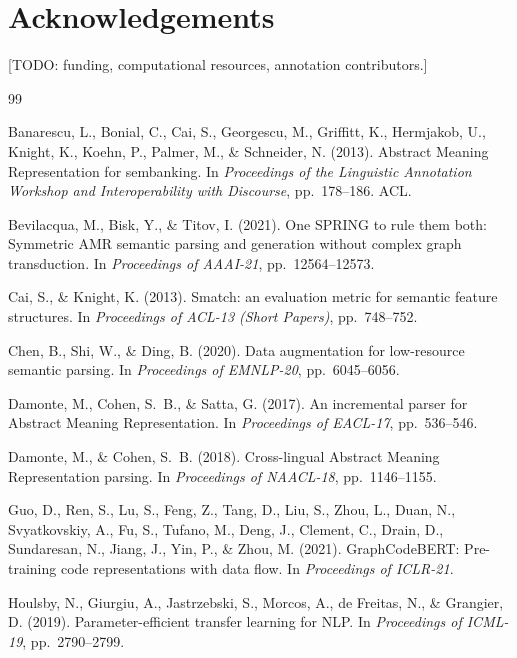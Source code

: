 \documentclass[11pt,a4paper]{article}
\begin{document}
\section*{Acknowledgements}

[TODO: funding, computational resources, annotation contributors.]


\begin{thebibliography}{99}

Banarescu, L., Bonial, C., Cai, S., Georgescu, M., Griffitt, K., Hermjakob,
U., Knight, K., Koehn, P., Palmer, M., \& Schneider, N. (2013).
Abstract Meaning Representation for sembanking.
In \textit{Proceedings of the Linguistic Annotation Workshop and Interoperability with Discourse},
pp.\ 178--186. ACL.

Bevilacqua, M., Bisk, Y., \& Titov, I. (2021).
One SPRING to rule them both: Symmetric AMR semantic parsing and generation
without complex graph transduction.
In \textit{Proceedings of AAAI-21}, pp.\ 12564--12573.

Cai, S., \& Knight, K. (2013).
Smatch: an evaluation metric for semantic feature structures.
In \textit{Proceedings of ACL-13 (Short Papers)}, pp.\ 748--752.

Chen, B., Shi, W., \& Ding, B. (2020).
Data augmentation for low-resource semantic parsing.
In \textit{Proceedings of EMNLP-20}, pp.\ 6045--6056.

Damonte, M., Cohen, S.\ B., \& Satta, G. (2017).
An incremental parser for Abstract Meaning Representation.
In \textit{Proceedings of EACL-17}, pp.\ 536--546.

Damonte, M., \& Cohen, S.\ B. (2018).
Cross-lingual Abstract Meaning Representation parsing.
In \textit{Proceedings of NAACL-18}, pp.\ 1146--1155.

Guo, D., Ren, S., Lu, S., Feng, Z., Tang, D., Liu, S., Zhou, L., Duan, N.,
Svyatkovskiy, A., Fu, S., Tufano, M., Deng, J., Clement, C., Drain, D.,
Sundaresan, N., Jiang, J., Yin, P., \& Zhou, M. (2021).
GraphCodeBERT: Pre-training code representations with data flow.
In \textit{Proceedings of ICLR-21}.

Houlsby, N., Giurgiu, A., Jastrzebski, S., Morcos, A., de Freitas, N., \&
Grangier, D. (2019).
Parameter-efficient transfer learning for NLP.
In \textit{Proceedings of ICML-19}, pp.\ 2790--2799.


\end{thebibliography}
\end{document}
